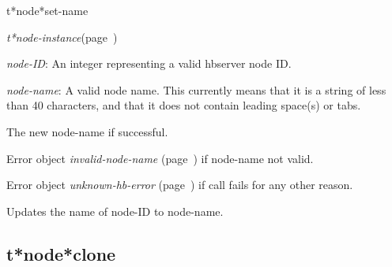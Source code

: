 \begin{description}
\item [Name:]  t*node*set-name

\item [Class:] {\sl t*node-instance}\hfill(page~\pageref{t*node-instance})

\item [Parameters:]
\item {\sl node-ID}:   An integer representing
a valid hbserver node ID.

\item {\sl node-name}:  
A valid node name. This currently means that it is a
string of less than 40 characters, and that it does
not contain leading space(s) or tabs.


\item [Return-value:]
The new node-name if successful.

Error object {\sl invalid-node-name} (page~\pageref{invalid-node-name}) if node-name not valid.

Error object {\sl unknown-hb-error} (page~\pageref{unknown-hb-error}) if call fails
for any other reason.

\item [Description:]

Updates the name of node-ID to node-name.

\item [Public:]



\end{description}
\horizontalline

\subsection{t*node*clone}
\label{t*node*clone}

